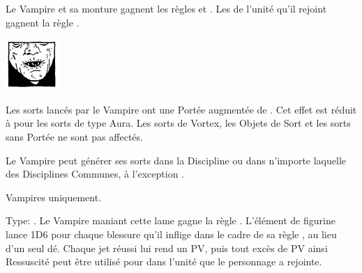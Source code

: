 \begin{multicols}{2}
 Le Vampire et sa monture gagnent les règles \poisonedattacks{} et . Les \ghouls{} de l'unité qu'il rejoint gagnent la règle \hatred{}.

\endpricelist

\begin{center}\includegraphics[width=2cm]{pics/logo_nosferatu.png}\end{center}
\vspace*{-1.2cm}

\startpricelist

 Les sorts lancés par le Vampire ont une Portée augmentée de . Cet effet est réduit à  pour les sorts de type Aura. Les sorts de Vortex, les Objets de Sort et les sorts sans Portée ne sont pas affectés.

 Le Vampire peut générer ses sorts dans la Discipline \necromancy{} ou dans n'importe laquelle des Disciplines Communes, à l'exception \nature{}.

\endpricelist

\end{multicols}

\closearmynewsection

\startarmymagicalitems

\armymagicalweapons

\startpricelist

 Vampires uniquement.

Type: \hw{}. Le Vampire maniant cette lame gagne la règle . L'élément de figurine lance 1D6 pour chaque blessure qu'il inflige dans le cadre de sa règle \vampiric{}, au lieu d'un seul dé. Chaque jet \vampiric{} réussi lui rend un PV, puis tout excès de PV ainsi Ressuscité peut être utilisé pour \raisewounds{} dans l'unité que le personnage a rejointe.

\endpricelist

\armymagicalarmour

\startpricelist

